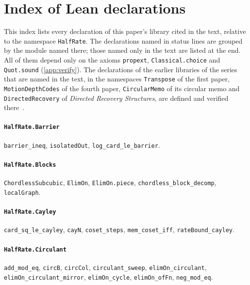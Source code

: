 \section{Index of Lean declarations}\label{app:index}

This index lists every declaration of this paper's library cited in the text, relative to the namespace
\texttt{HalfRate}. The declarations named in status lines are grouped by the module named there; those named only
in the text are listed at the end. All of them depend only on the axioms \texttt{propext}, \texttt{Classical.choice} and
\texttt{Quot.sound} (\cref{app:verify}). The declarations of the earlier libraries of the series that are named in
the text, in the namespaces \texttt{Transpose} of the first paper, \texttt{MotionDepthCodes} of the fourth paper,
\texttt{CircularMemo} of its circular memo and \texttt{DirectedRecovery} of \emph{Directed Recovery Structures},
are defined and verified there~\cite{FirstPaper2026,FourthPaper2026,CircularMemo2026,DirectedRecovery2026}.

\paragraph{\texttt{HalfRate.Barrier}}
{\small\raggedright \texttt{barrier\_ineq}, \texttt{isolatedOut}, \texttt{log\_card\_le\_barrier}.\par}

\paragraph{\texttt{HalfRate.Blocks}}
{\small\raggedright \texttt{ChordlessSubcubic}, \texttt{ElimOn}, \texttt{ElimOn.piece}, \texttt{chordless\_block\_decomp}, \texttt{localGraph}.\par}

\paragraph{\texttt{HalfRate.Cayley}}
{\small\raggedright \texttt{card\_sq\_le\_cayley}, \texttt{cayN}, \texttt{coset\_steps}, \texttt{mem\_coset\_iff}, \texttt{rateBound\_cayley}.\par}

\paragraph{\texttt{HalfRate.Circulant}}
{\small\raggedright \texttt{add\_mod\_eq}, \texttt{circB}, \texttt{circCol}, \texttt{circulant\_sweep}, \texttt{elimOn\_circulant}, \texttt{elimOn\_circulant\_mirror}, \texttt{elimOn\_cycle}, \texttt{elimOn\_ofFn}, \texttt{neg\_mod\_eq}.\par}

